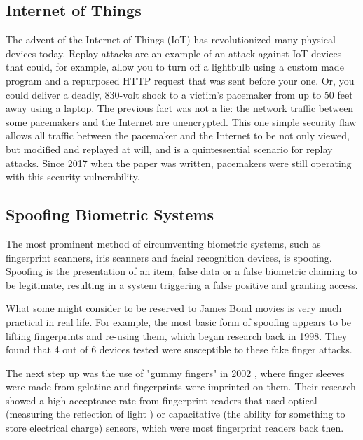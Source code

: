 \documentclass[a4paper, 11pt]{article}
\begin{document}
\subsection{Internet of Things}
\label{sec:iot}
The advent of the Internet of Things (IoT) has revolutionized many physical devices today. Replay attacks are an example of an attack against IoT devices that could, for example, allow you to turn off a lightbulb using a custom made program and a repurposed HTTP request that was sent before your one. Or, you could deliver a deadly, 830-volt shock to a victim's pacemaker from up to 50 feet away using a laptop. \cite{ref:pacemakers} The previous fact was not a lie: the network traffic between some pacemakers and the Internet are unencrypted. \cite{ref:pacemakers} This one simple security flaw allows all traffic between the pacemaker and the Internet to be not only viewed, but modified and replayed at will, and is a quintessential scenario for replay attacks. Since 2017 when the paper was written, pacemakers were still operating with this security vulnerability.

\subsection{Spoofing Biometric Systems}
\label{sec:spoofingbiometric}
The most prominent method of circumventing biometric systems, such as fingerprint scanners, iris scanners and facial recognition devices, is spoofing. \cite{ref:biometricattackvectors} Spoofing is the presentation of an item, false data or a false biometric claiming to be legitimate, resulting in a system triggering a false positive and granting access. \cite{ref:biometricattackvectors}

What some might consider to be reserved to James Bond movies is very much practical in real life. For example, the most basic form of spoofing appears to be lifting fingerprints and re-using them, which began research back in 1998. \cite{ref:biometricattackvectors,ref:willis1998six} They found that 4 out of 6 devices tested were susceptible to these fake finger attacks. \cite{ref:willis1998six}

The next step up was the use of "gummy fingers" in 2002 \cite{ref:matsumoto2002impact}, where finger sleeves were made from gelatine and fingerprints were imprinted on them. Their research showed a high acceptance rate from fingerprint readers that used optical (measuring the reflection of light \cite{ref:matsumoto2002impact}) or capacitative (the ability for something to store electrical charge) sensors, which were most fingerprint readers back then. \cite{ref:matsumoto2002impact}
\end{document}
